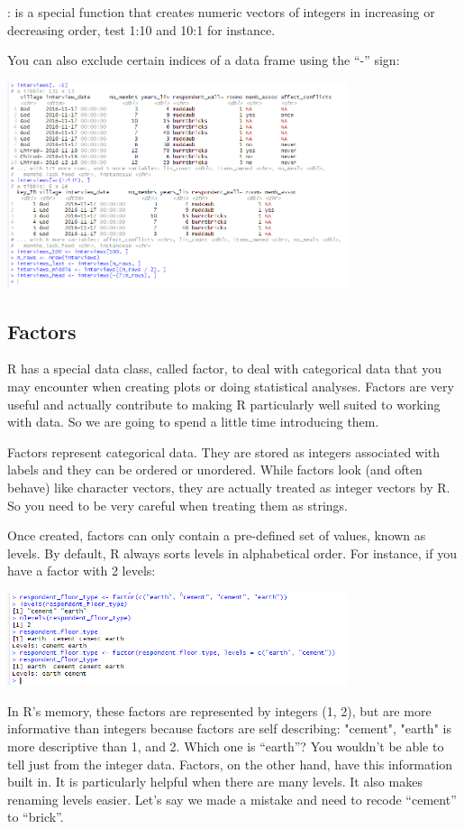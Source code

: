 \documentclass{article}
\begin{document}
: is a special function that creates numeric vectors of integers in increasing or decreasing order, test 1:10 and 10:1 for instance.

You can also exclude certain indices of a data frame using the “-” sign:    

\includegraphics[width=10cm]{Images/RStudio023.PNG}

\subsection{Factors}

R has a special data class, called factor, to deal with categorical data that you may encounter when creating plots or doing statistical analyses. Factors are very useful and actually contribute to making R particularly well suited to working with data. So we are going to spend a little time introducing them.

Factors represent categorical data. They are stored as integers associated with labels and they can be ordered or unordered. While factors look (and often behave) like character vectors, they are actually treated as integer vectors by R. So you need to be very careful when treating them as strings.

Once created, factors can only contain a pre-defined set of values, known as levels. By default, R always sorts levels in alphabetical order. For instance, if you have a factor with 2 levels:

\includegraphics[width=10cm]{Images/RStudio024.PNG}

In R’s memory, these factors are represented by integers (1, 2), but are more informative than integers because factors are self describing: "cement", "earth" is more descriptive than 1, and 2. Which one is “earth”? You wouldn’t be able to tell just from the integer data. Factors, on the other hand, have this information built in. It is particularly helpful when there are many levels. It also makes renaming levels easier. Let’s say we made a mistake and need to recode “cement” to “brick”.
\end{document}
